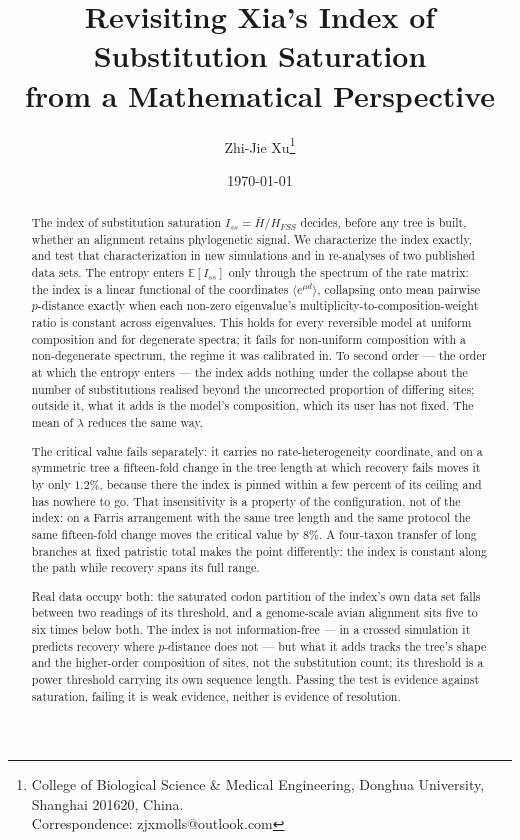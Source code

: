 \documentclass[11pt]{article}
\title{Revisiting Xia's Index of Substitution Saturation\\
       from a Mathematical Perspective}
\author{Zhi-Jie Xu\thanks{College of Biological Science \& Medical Engineering,
        Donghua University, Shanghai 201620, China.\\
        Correspondence: zjxmolls@outlook.com}}
\date{\today}
\newcommand{\Iss}{I_{ss}}
\newcommand{\Hbar}{\bar H}
\newcommand{\HFSS}{H_{FSS}}
\newcommand{\E}{\mathbb{E}}
\theoremstyle{definition}
\theoremstyle{remark}
\begin{document}
\linenumbers
\maketitle

\begin{abstract}
\noindent
The index of substitution saturation $\Iss=\Hbar/\HFSS$
\citep{xia2003iss} decides, before any tree is built, whether an alignment
retains phylogenetic signal. We characterize the index exactly, and test that
characterization in new simulations and in re-analyses of two published
data sets. The entropy enters $\E[\Iss]$ only through the
spectrum of the rate matrix: the index is a linear functional of
the coordinates $\langle e^{\mu d}\rangle$, collapsing onto mean pairwise
$p$-distance exactly when each non-zero eigenvalue's
multiplicity-to-composition-weight ratio is constant across eigenvalues. This holds for every reversible model at uniform composition and
for degenerate spectra; it fails for non-uniform composition with a
non-degenerate spectrum, the regime it was calibrated in. To second order ---
the order at which the entropy enters --- the index adds nothing under the
collapse about the number of substitutions realised beyond the uncorrected
proportion of differing sites; outside it, what it adds is the model's
composition, which its user has not fixed. The mean of $\lambda$ reduces the
same way.

The critical value fails separately: it carries no rate-heterogeneity
coordinate, and on a symmetric tree a fifteen-fold change in the tree length
at which recovery fails moves it by only $1.2\%$, because there the index is
pinned within a few percent of its ceiling and has nowhere to go. That
insensitivity is a property of the configuration, not of the index: on a
Farris arrangement with the same tree length and the same protocol the same
fifteen-fold change moves the critical value by $8\%$. A four-taxon transfer
of long branches at fixed patristic total makes the point differently: the
index is constant along the path while recovery spans its full range.

Real data occupy both: the saturated codon partition of the index's
own data set falls between two readings of its threshold, and a genome-scale
avian alignment sits five to six times below both. The index is
not information-free --- in a crossed simulation it predicts recovery where
$p$-distance does not --- but what it adds tracks the tree's shape and the
higher-order composition of sites, not the substitution count; its threshold
is a power threshold carrying its own sequence length. Passing the test is
evidence against saturation, failing it is weak evidence, neither is evidence
of resolution.
\end{abstract}
\end{document}
